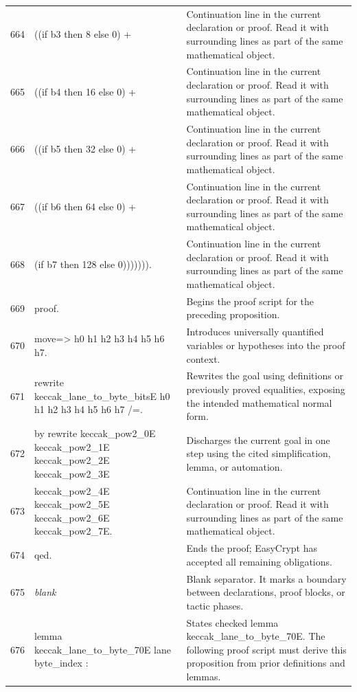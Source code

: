 \documentclass[10pt]{article}
\begin{document}
\begin{longtable}{r L{0.53\textwidth} L{0.37\textwidth}}
664 & {\ttfamily\scriptsize   ((if b3 then 8 else 0) +} & Continuation line in the current declaration or proof.  Read it with surrounding lines as part of the same mathematical object. \\
665 & {\ttfamily\scriptsize   ((if b4 then 16 else 0) +} & Continuation line in the current declaration or proof.  Read it with surrounding lines as part of the same mathematical object. \\
666 & {\ttfamily\scriptsize   ((if b5 then 32 else 0) +} & Continuation line in the current declaration or proof.  Read it with surrounding lines as part of the same mathematical object. \\
667 & {\ttfamily\scriptsize   ((if b6 then 64 else 0) +} & Continuation line in the current declaration or proof.  Read it with surrounding lines as part of the same mathematical object. \\
668 & {\ttfamily\scriptsize    (if b7 then 128 else 0))))))).} & Continuation line in the current declaration or proof.  Read it with surrounding lines as part of the same mathematical object. \\
669 & {\ttfamily\scriptsize proof.} & Begins the proof script for the preceding proposition. \\
670 & {\ttfamily\scriptsize move=> h0 h1 h2 h3 h4 h5 h6 h7.} & Introduces universally quantified variables or hypotheses into the proof context. \\
671 & {\ttfamily\scriptsize rewrite keccak\_lane\_to\_byte\_bitsE h0 h1 h2 h3 h4 h5 h6 h7 /=.} & Rewrites the goal using definitions or previously proved equalities, exposing the intended mathematical normal form. \\
672 & {\ttfamily\scriptsize by rewrite keccak\_pow2\_0E keccak\_pow2\_1E keccak\_pow2\_2E keccak\_pow2\_3E} & Discharges the current goal in one step using the cited simplification, lemma, or automation. \\
673 & {\ttfamily\scriptsize            keccak\_pow2\_4E keccak\_pow2\_5E keccak\_pow2\_6E keccak\_pow2\_7E.} & Continuation line in the current declaration or proof.  Read it with surrounding lines as part of the same mathematical object. \\
674 & {\ttfamily\scriptsize qed.} & Ends the proof; EasyCrypt has accepted all remaining obligations. \\
675 & {\ttfamily\scriptsize \emph{blank}} & Blank separator.  It marks a boundary between declarations, proof blocks, or tactic phases. \\
676 & {\ttfamily\scriptsize lemma keccak\_lane\_to\_byte\_70E lane byte\_index :} & States checked lemma keccak\_lane\_to\_byte\_70E.  The following proof script must derive this proposition from prior definitions and lemmas. \\

\end{longtable}
\end{document}
